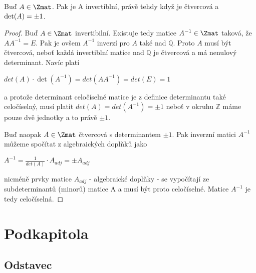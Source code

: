 \begin{lem}
    Buď $A \in \Zmat$. Pak je A invertiblní, právě tehdy když je čtvercová a
    $\textnormal{det}(A) = \pm1$.
\end{lem}
\begin{proof}
    Buď $A \in \Zmat$ invertibilní. Existuje tedy matice $A^{-1} \in \Zmat$
    taková, že $AA^{-1} = E$. Pak je ovšem $A^{-1}$ inverzí pro $A$ také nad
    $\mathbb{Q}$. Proto $A$ musí být čtvercová, neboť každá invertiblní matice
    nad $\mathbb{Q}$ je čtvercová a má nenulový determinant. Navíc platí
    \begin{center}
        $det(A) \cdot \det(A^{-1}) = det(AA^{-1}) = det(E) = 1$
    \end{center}
    a protože determinant celočíselné matice je z definice determinantu
    také celočíselný, musí platit $det(A) = det(A^{-1}) = \pm1$ neboť v okruhu
    $\mathbb{Z}$ máme pouze dvě jednotky a to právě $\pm1$.

    Buď naopak  $A \in \Zmat$ čtvercová s determinantem $\pm1$. Pak inverzní
    matici $A^{-1}$ můžeme spočítat z algebraických doplňků jako
    \begin{center}
        $A^{-1} = \frac{1}{det(A)} \cdot A_{adj} = \pm A_{adj}$
    \end{center}
    nicméně prvky matice $A_{adj}$ - algebraické doplňky - se vypočítají
    ze subdeterminantů (minorů) matice A a musí být proto celočíselné. Matice
    $A^{-1}$ je tedy celočíselná.
\end{proof}

\section{Podkapitola}

\lipsum[98-105]

\subsection{Odstavec}

\lipsum[140-145]
\shorthandon{-}
